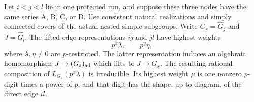 \begin{proposition}\label{w:rational-composition}
Let $i<j<l$ lie in one protected run, and suppose these three nodes have the same series A, B, C, or D. Use consistent natural realizations and simply connected covers of the actual nested simple subgroups. Write $G_s=\widehat G_j$ and $J=\widehat G_l$. The lifted edge representations $ij$ and $jl$ have highest weights
\[
 p^x\lambda,\qquad p^y\eta,
\]
where $\lambda,\eta\ne0$ are $p$-restricted. The latter representation induces an algebraic homomorphism $J\to (G_s)_{\rm ad}$ which lifts to $J\to G_s$. The resulting rational composition of $L_{G_s}(p^x\lambda)$ is irreducible. Its highest weight $\mu$ is one nonzero $p$-digit times a power of $p$, and that digit has the shape, up to diagram, of the direct edge $il$.
\end{proposition}
